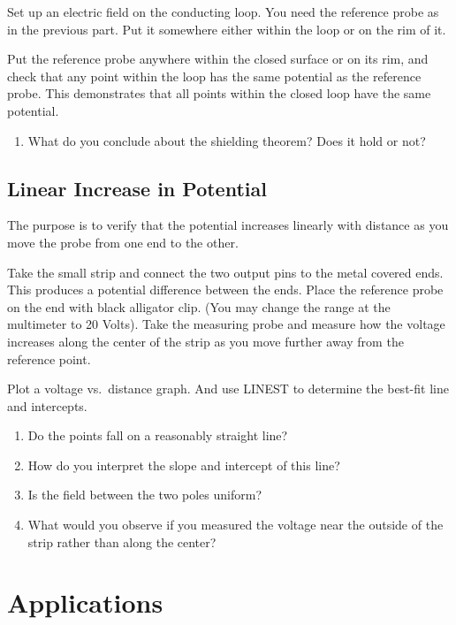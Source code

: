Set up an electric field on the conducting loop. You need the reference probe as in the previous part. Put it somewhere either within the loop or on the rim of it.\myskip

Put the reference probe anywhere within the closed surface or on its rim, and check that any point within the loop has the same potential as the reference probe. This demonstrates that all points within the closed loop have the same potential.
\begin{enumerate}
    \item What do you conclude about the shielding theorem? Does it hold or not?
\end{enumerate}

\subsection{Linear Increase in Potential}

The purpose is to verify that the potential increases linearly with distance as you move the probe from one end to the other.\myskip

Take the small strip and connect the two output pins to the metal covered ends. This produces a potential difference between the ends. Place the reference probe on the end with black alligator clip. (You may change the range at the multimeter to 20 Volts). Take the measuring probe and measure how the voltage increases along the center of the strip as you move further away from the reference point.\myskip

Plot a voltage vs.\ distance graph. And use LINEST to determine the best-fit line and intercepts.
\begin{enumerate}
    \item Do the points fall on a reasonably straight line?
    \item How do you interpret the slope and intercept of this line?
    \item Is the field between the two poles uniform?
    \item What would you observe if you measured the voltage near the outside of the strip rather than along the center?
\end{enumerate}

\section{Applications}

